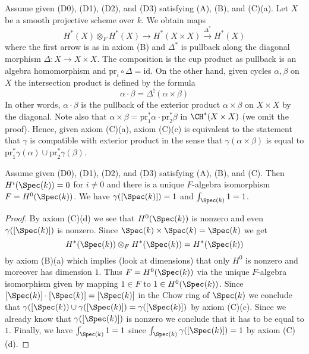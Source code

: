 \begin{remark}
\label{remark-replace-cup-product}
Assume given (D0), (D1), (D2), and (D3) satisfying (A), (B), and (C)(a).
Let $X$ be a smooth projective scheme over $k$. We obtain maps
$$
H^*(X) \otimes_F H^*(X) \longrightarrow H^*(X \times X)
\xrightarrow{\Delta^*} H^*(X)
$$
where the first arrow is as in axiom (B) and $\Delta^*$
is pullback along the diagonal morphism $\Delta : X \to X \times X$.
The composition is the cup product as pullback is an algebra homomorphism and
$\text{pr}_i \circ \Delta = \text{id}$.
On the other hand, given cycles $\alpha, \beta$ on $X$ 
the intersection product is defined by the formula
$$
\alpha \cdot \beta =
\Delta^!(\alpha \times \beta)
$$
In other words, $\alpha \cdot \beta$ is the pullback of the
exterior product $\alpha \times \beta$ on $X \times X$ by
the diagonal. Note also that
$\alpha \times \beta = \text{pr}_1^*\alpha \cdot \text{pr}_2^*\beta$
in $\CH^*(X \times X)$ (we omit the proof). Hence, given axiom (C)(a),
axiom (C)(c) is equivalent to the statement that $\gamma$ is
compatible with exterior product in the sense that
$\gamma(\alpha \times \beta)$ is equal to
$\text{pr}_1^*\gamma(\alpha) \cup \text{pr}_2^*\gamma(\beta)$.
\end{remark}

\begin{lemma}
\label{lemma-base}
Assume given (D0), (D1), (D2), and (D3) satisfying (A), (B), and (C).
Then $H^i(\Spec(k)) = 0$ for $i \not = 0$ and there is a
unique $F$-algebra isomorphism $F = H^0(\Spec(k))$.
We have $\gamma([\Spec(k)]) = 1$ and $\int_{\Spec(k)} 1 = 1$.
\end{lemma}

\begin{proof}
By axiom (C)(d) we see that $H^0(\Spec(k))$ is nonzero and even
$\gamma([\Spec(k)])$ is nonzero.
Since $\Spec(k) \times \Spec(k) = \Spec(k)$ we get
$$
H^*(\Spec(k)) \otimes_F H^*(\Spec(k)) = H^*(\Spec(k))
$$
by axiom (B)(a) which implies (look at dimensions) that only
$H^0$ is nonzero and moreover has dimension $1$. Thus
$F = H^0(\Spec(k))$ via the unique $F$-algebra isomorphism
given by mapping $1 \in F$ to $1 \in H^0(\Spec(k))$.
Since $[\Spec(k)] \cdot [\Spec(k)] = [\Spec(k)]$ in the
Chow ring of $\Spec(k)$ we conclude that
$\gamma([\Spec(k)) \cup \gamma([\Spec(k)]) = \gamma([\Spec(k)])$
by axiom (C)(c). Since we already know that $\gamma([\Spec(k)])$ is nonzero
we conclude that it has to be equal to $1$.
Finally, we have $\int_{\Spec(k)} 1 = 1$ since
$\int_{\Spec(k)} \gamma([\Spec(k)]) = 1$
by axiom (C)(d).
\end{proof}

